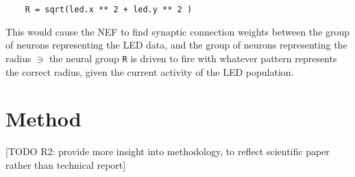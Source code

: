 \documentclass[conference]{IEEEtran}
\begin{document}
\begin{lstlisting}
	R = sqrt(led.x ** 2 + led.y ** 2 )
\end{lstlisting}

This would cause the NEF to find synaptic connection weights between the group of neurons representing the LED data, and the group of neurons representing the radius $\ni$ the neural group \texttt{R} is driven to fire with whatever pattern represents the correct radius, given the current activity of the LED population. 

\section{Method}
[TODO R2: provide more insight into methodology, to reflect scientific paper rather than technical report]
\end{document}

